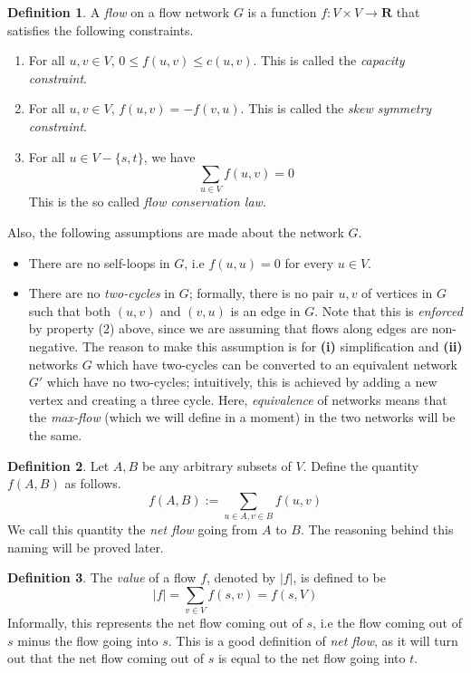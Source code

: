 \documentclass[12pt,a4paper]{amsart}
\numberwithin{equation}{section}
\theoremstyle{definition}
\newtheorem{Def}{Definition}[section]
\begin{document}
\begin{Def}
	A \textit{flow} on a flow network $G$ is a function $f:V\times V\to \textbf{R}$ that satisfies the following constraints. 
	\begin{enumerate}
		\item For all $u, v\in V$, $0\le f(u, v)\le c(u, v)$. This is called the \textit{capacity constraint}. 
		\item For all $u, v\in V$, $f(u, v) = -f(v , u)$. This is called the \textit{skew symmetry constraint}.  
		\item For all $u\in V - \{s, t\}$, we have 
		$$\sum_{u\in V}f(u, v) = 0$$
		This is the so called \textit{flow conservation law}. 
	\end{enumerate}
	Also, the following assumptions are made about the network $G$.
	\begin{itemize}
		\item There are no self-loops in $G$, i.e $f(u, u) = 0$ for every $u\in V$.
		\item There are no \textit{two-cycles} in $G$; formally, there is no pair $u, v$ of vertices in $G$ such that both $(u, v)$ and $(v, u)$ is an edge in $G$. Note that this is \textit{enforced} by property (2) above, since we are assuming that flows along edges are non-negative. The reason to make this assumption is for \textbf{(i)} simplification and \textbf{(ii)} networks $G$ which have two-cycles can be converted to an equivalent network $G'$ which have no two-cycles; intuitively, this is achieved by adding a new vertex and creating a three cycle. Here, \textit{equivalence} of networks means that the \textit{max-flow} (which we will define in a moment) in the two networks will be the same.
	\end{itemize}
\end{Def}

\newcommand{\netflow}[2]{f(#1, #2)}
\newcommand{\netflowExpandSingle}[2]{\sum_{u\in #2} f(#1, u)}
\newcommand{\netflowExpand}[2]{\sum_{u\in #1, v\in #2} f(u, v)}

\begin{Def}
	Let $A, B$ be any arbitrary subsets of $V$. Define the quantity $\netflow{A}{B}$ as follows. 
	$$\netflow{A}{B} := \sum_{u\in A, v\in B}f(u, v)$$
	We call this quantity the \textit{net flow} going from $A$ to $B$. The reasoning behind this naming will be proved later. 
\end{Def}

\newcommand{\flowValue}[1]{|#1|}
\begin{Def}
	The \textit{value} of a flow $f$, denoted by $\flowValue{f}$, is defined to be 
	$$\flowValue{f} = \sum_{v\in V} f(s, v) = \netflow{s}{V}$$
	Informally, this represents the net flow coming out of $s$, i.e the flow coming out of $s$ minus the flow going into $s$. This is a good definition of \textit{net flow}, as it will turn out that the net flow coming out of $s$ is equal to the net flow going into $t$. 
\end{Def}
\end{document}
